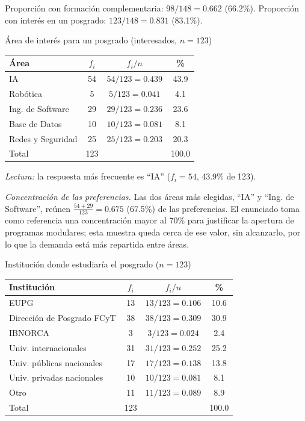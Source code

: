 Proporción con formación complementaria: $98/148 = 0.662$ (66.2\%). Proporción con interés en un posgrado: $123/148 = 0.831$ (83.1\%).

\begin{mitabla}{Área de interés para un posgrado (interesados, $n=123$)}
\begin{tabular}{lccc}
\toprule
Área & $f_i$ & $f_i / n$ & \% \\
\midrule
IA & 54 & $54/123 = 0.439$ & 43.9 \\
Robótica & 5 & $5/123 = 0.041$ & 4.1 \\
Ing. de Software & 29 & $29/123 = 0.236$ & 23.6 \\
Base de Datos & 10 & $10/123 = 0.081$ & 8.1 \\
Redes y Seguridad & 25 & $25/123 = 0.203$ & 20.3 \\
\midrule
Total & 123 & & 100.0 \\
\bottomrule
\end{tabular}
\end{mitabla}

\textit{Lectura:} la respuesta más frecuente es ``IA'' ($f_i = 54$, 43.9\% de 123).

\textit{Concentración de las preferencias.} Las dos áreas más elegidas, ``IA'' y ``Ing. de Software'', reúnen $\frac{54 + 29}{123} = 0.675$ (67.5\%) de las preferencias. El enunciado toma como referencia una concentración mayor al 70\% para justificar la apertura de programas modulares; esta muestra queda cerca de ese valor, sin alcanzarlo, por lo que la demanda está más repartida entre áreas.

\begin{mitabla}{Institución donde estudiaría el posgrado ($n=123$)}
\begin{tabular}{lccc}
\toprule
Institución & $f_i$ & $f_i / n$ & \% \\
\midrule
EUPG & 13 & $13/123 = 0.106$ & 10.6 \\
Dirección de Posgrado FCyT & 38 & $38/123 = 0.309$ & 30.9 \\
IBNORCA & 3 & $3/123 = 0.024$ & 2.4 \\
Univ. internacionales & 31 & $31/123 = 0.252$ & 25.2 \\
Univ. públicas nacionales & 17 & $17/123 = 0.138$ & 13.8 \\
Univ. privadas nacionales & 10 & $10/123 = 0.081$ & 8.1 \\
Otro & 11 & $11/123 = 0.089$ & 8.9 \\
\midrule
Total & 123 & & 100.0 \\
\bottomrule
\end{tabular}
\end{mitabla}

